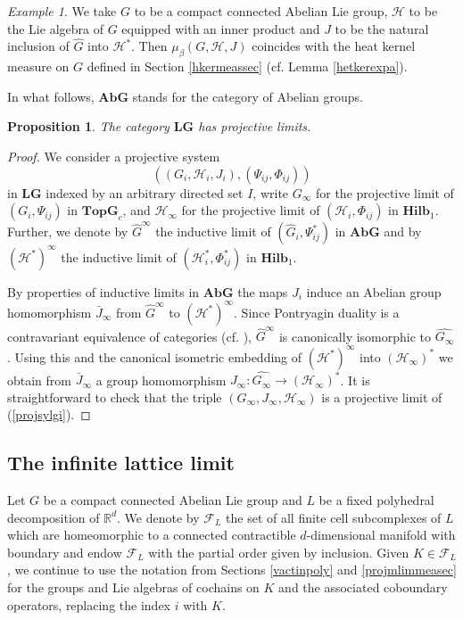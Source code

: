 \documentclass[11pt,reqno]{amsart}
\numberwithin{equation}{section}
\newtheorem{proposition}[theorem]{Proposition}
\theoremstyle{remark}
\newtheorem{example}[theorem]{Example}
\theoremstyle{rmdefinition}
\begin{document}
\begin{example}\label{comgrexlg}
We take $G$ to be a compact connected Abelian Lie group, $\mathcal H$ to be the Lie algebra of $G$ equipped with an inner product and $J$ to be the natural inclusion of $\widehat{G}$ into $\mathcal H^*$. Then $\mu_{\beta}(G,\mathcal H,J)$ coincides with the heat kernel measure on $G$ defined in Section \ref{hkermeassec} (cf. Lemma \ref{hetkerexpa}). 
\end{example}
In what follows, $\mathbf{AbG}$ stands for the category of Abelian groups.
\begin{proposition}
The category $\mathbf{LG}$ has projective limits.
\end{proposition}
\begin{proof}
We consider a projective system 
\begin{equation}\label{projsylgi}
((G_i,\mathcal{H}_i,J_i),(\Psi_{ij},\Phi_{ij}))
\end{equation}
in $\mathbf{LG}$ indexed by an arbitrary directed set $I$,
write $G_\infty$ for the projective limit of $(G_i,\Psi_{ij})$ in $\mathbf{TopG}_c$, and $\mathcal{H}_\infty$ for the projective limit of 
$(\mathcal{H}_i,\Phi_{ij})$ in $\mathbf{Hilb}_1$. Further, we denote by $\widehat{G}^{\infty}$ the inductive limit of $(\widehat{G}_i,\Psi^*_{ij})$ in  $\mathbf{AbG}$ and by $(\mathcal{H}^*)^\infty$ the inductive limit of $(\mathcal{H}^*_i,\Phi^*_{ij})$ in $\mathbf{Hilb}_1$.

By properties of inductive limits in  $\mathbf{AbG}$ the maps $J_i$ induce an Abelian group homomorphism $\bar{J}_{\infty}$ from $\widehat{G}^{\infty}$ to $(\mathcal{H}^*)^\infty$. Since Pontryagin duality is a contravariant equivalence of categories (cf. \cite[Theorem 5]{Roe}), $\widehat{G}^{\infty}$ is canonically isomorphic to  $\widehat{G_\infty}$. Using this and the canonical isometric embedding of $(\mathcal{H}^*)^\infty$ into $(\mathcal{H}_\infty)^*$ we obtain from $\bar{J}_{\infty}$ a group homomorphism $J_{\infty}:\widehat{G_\infty}   \to (\mathcal{H}_\infty)^*$. It is straightforward to check that the triple $(G_\infty,J_{\infty},\mathcal{H}_\infty)$ is a projective limit of (\ref{projsylgi}).
\end{proof}

\subsection{The infinite lattice limit}\label{altinflatclim}
Let $G$ be a compact connected Abelian Lie group and $L$ be a fixed polyhedral decomposition of $\mathbb{R}^d$. We denote by $\mathcal{F}_{L}$ the set of all finite cell subcomplexes of $L$ which are homeomorphic to a connected contractible $d$-dimensional manifold with boundary and endow $\mathcal{F}_{L}$ with the partial order given by inclusion. Given $K \in \mathcal{F}_{L}$, we continue to use the notation from Sections \ref{vactinpoly} and \ref{projmlimmeasec} for the groups and Lie algebras of cochains on $K$ and the associated coboundary operators, replacing the index $i$ with $K$.
\end{document}
